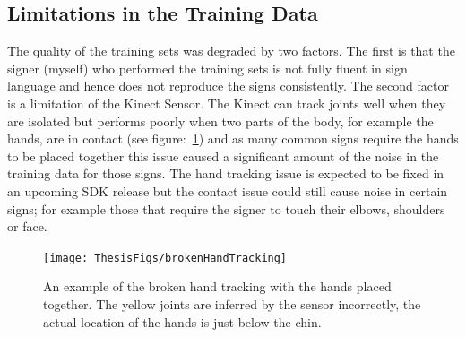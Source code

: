 \subsection{Limitations in the Training Data}
The quality of the training sets was degraded by two factors. The first is that the signer (myself) who performed the training sets is not fully fluent in sign language and hence does not reproduce the signs consistently. The second factor is a limitation of the Kinect Sensor. The Kinect can track joints well when they are isolated but performs poorly when two parts of the body, for example the hands, are in contact (see figure:~\ref{fig:brokht}) and as many common signs require the hands to be placed together this issue caused a significant amount of the noise in the training data for those signs. The hand tracking issue is expected to be fixed in an upcoming SDK release but the contact issue could still cause noise in certain signs; for example those that require the signer to touch their elbows, shoulders or face.

\begin{figure}[h!]
        \centering
        \texttt{[image: ThesisFigs/brokenHandTracking]}
        \caption{An example of the broken hand tracking with the hands placed together. The yellow joints are inferred by the sensor incorrectly, the actual location of the hands is just below the chin.}\label{fig:brokht}
\end{figure}


